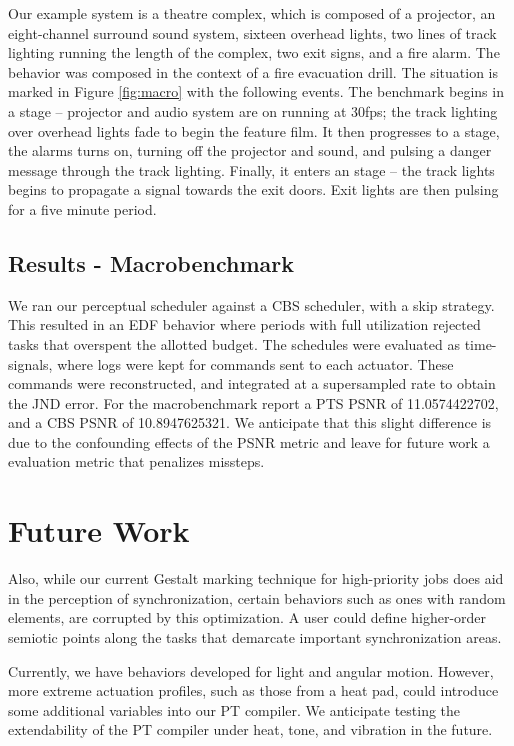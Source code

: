 \documentclass{sigchi}
\newcommand*{\schedule}[1]{{\textbf{\small{\fontfamily{cmss}\selectfont{#1}}}}}
\begin{document}
  Our example system is a theatre complex, which is composed of a projector, an eight-channel surround sound system, sixteen overhead lights, two lines of track lighting running the length of the complex, two exit signs, and a fire alarm. The behavior was composed in the context of a fire evacuation drill. The situation is marked in Figure \ref{fig:macro} with the following events. The benchmark begins in a \schedule{IDLE} stage – projector and audio system are on running at 30fps; the track lighting over overhead lights fade to begin the feature film. It then progresses to a \schedule{ALERT} stage, the alarms turns on, turning off the projector and sound, and pulsing a danger message through the track lighting. Finally, it enters an \schedule{EXIT} stage – the track lights begins to propagate a signal towards the exit doors. Exit lights are then pulsing for a five minute period. 


  \subsection{Results - Macrobenchmark}
  We ran our perceptual scheduler against a CBS scheduler, with a skip strategy. This resulted in an EDF behavior where periods with full utilization rejected tasks that overspent the allotted budget. The schedules were evaluated as time-signals, where logs were kept for commands sent to each actuator. These commands were reconstructed, and integrated at a supersampled rate to obtain the JND error. 
  For the macrobenchmark report a PTS PSNR of 11.0574422702, and a CBS PSNR of 10.8947625321.
  We anticipate that this slight difference is due to the confounding effects of the PSNR metric and leave for future work a evaluation metric that penalizes missteps. 


  \section{Future Work}
  Also, while our current Gestalt marking technique for high-priority jobs does aid in the perception of synchronization, certain behaviors such as ones with random elements, are corrupted by this optimization. A user could define higher-order semiotic points along the tasks that demarcate important synchronization areas. 

  Currently, we have behaviors developed for light and angular motion. However, more extreme actuation profiles, such as those from a heat pad, could introduce some additional variables into our PT compiler. We anticipate testing the extendability of the PT compiler under heat, tone, and vibration in the future. 
\end{document}
